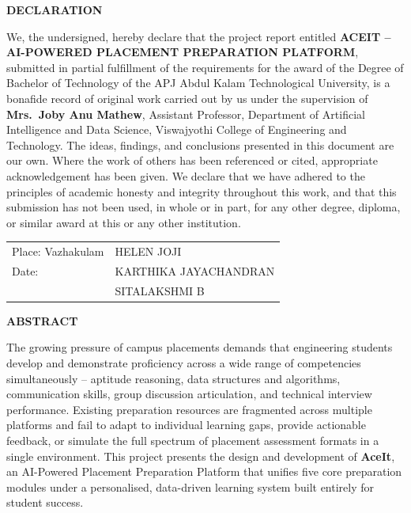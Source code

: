 \documentclass[12pt,a4paper]{report}
\begin{document}
\clearpage
\pagestyle{empty}
\begin{center}
    {\large\bfseries DECLARATION}
\end{center}
\vspace{0.5cm}

\noindent
We, the undersigned, hereby declare that the project report entitled \textbf{ACEIT -- AI-POWERED PLACEMENT PREPARATION PLATFORM}, submitted in partial fulfillment of the requirements for the award of the Degree of Bachelor of Technology of the APJ Abdul Kalam Technological University, is a bonafide record of original work carried out by us under the supervision of \textbf{Mrs.\ Joby Anu Mathew}, Assistant Professor, Department of Artificial Intelligence and Data Science, Viswajyothi College of Engineering and Technology. The ideas, findings, and conclusions presented in this document are our own. Where the work of others has been referenced or cited, appropriate acknowledgement has been given. We declare that we have adhered to the principles of academic honesty and integrity throughout this work, and that this submission has not been used, in whole or in part, for any other degree, diploma, or similar award at this or any other institution.

\vspace{2.5cm}

\noindent
\begin{tabular}{p{} p{}}
    Place: Vazhakulam & HELEN JOJI \\[0.5cm]
    Date: \underline{\hspace{3cm}} & KARTHIKA JAYACHANDRAN \\[0.5cm]
     & SITALAKSHMI B \\
\end{tabular}
\clearpage

\clearpage
\pagestyle{empty}
\begin{center}
    {\large\bfseries ABSTRACT}
\end{center}
\vspace{0.5cm}

\noindent
The growing pressure of campus placements demands that engineering students develop and demonstrate proficiency across a wide range of competencies simultaneously -- aptitude reasoning, data structures and algorithms, communication skills, group discussion articulation, and technical interview performance. Existing preparation resources are fragmented across multiple platforms and fail to adapt to individual learning gaps, provide actionable feedback, or simulate the full spectrum of placement assessment formats in a single environment. This project presents the design and development of \textbf{AceIt}, an AI-Powered Placement Preparation Platform that unifies five core preparation modules under a personalised, data-driven learning system built entirely for student success.
\end{document}
